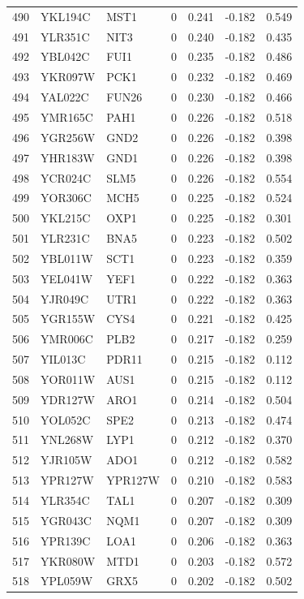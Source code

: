 \begin{longtable}{rllrrrr}
490 & YKL194C & MST1 & 0 & 0.241 & -0.182 & 0.549\\
491 & YLR351C & NIT3 & 0 & 0.240 & -0.182 & 0.435\\
492 & YBL042C & FUI1 & 0 & 0.235 & -0.182 & 0.486\\
493 & YKR097W & PCK1 & 0 & 0.232 & -0.182 & 0.469\\
494 & YAL022C & FUN26 & 0 & 0.230 & -0.182 & 0.466\\
495 & YMR165C & PAH1 & 0 & 0.226 & -0.182 & 0.518\\
496 & YGR256W & GND2 & 0 & 0.226 & -0.182 & 0.398\\
497 & YHR183W & GND1 & 0 & 0.226 & -0.182 & 0.398\\
498 & YCR024C & SLM5 & 0 & 0.226 & -0.182 & 0.554\\
499 & YOR306C & MCH5 & 0 & 0.225 & -0.182 & 0.524\\
500 & YKL215C & OXP1 & 0 & 0.225 & -0.182 & 0.301\\
501 & YLR231C & BNA5 & 0 & 0.223 & -0.182 & 0.502\\
502 & YBL011W & SCT1 & 0 & 0.223 & -0.182 & 0.359\\
503 & YEL041W & YEF1 & 0 & 0.222 & -0.182 & 0.363\\
504 & YJR049C & UTR1 & 0 & 0.222 & -0.182 & 0.363\\
505 & YGR155W & CYS4 & 0 & 0.221 & -0.182 & 0.425\\
506 & YMR006C & PLB2 & 0 & 0.217 & -0.182 & 0.259\\
507 & YIL013C & PDR11 & 0 & 0.215 & -0.182 & 0.112\\
508 & YOR011W & AUS1 & 0 & 0.215 & -0.182 & 0.112\\
509 & YDR127W & ARO1 & 0 & 0.214 & -0.182 & 0.504\\
510 & YOL052C & SPE2 & 0 & 0.213 & -0.182 & 0.474\\
511 & YNL268W & LYP1 & 0 & 0.212 & -0.182 & 0.370\\
512 & YJR105W & ADO1 & 0 & 0.212 & -0.182 & 0.582\\
513 & YPR127W & YPR127W & 0 & 0.210 & -0.182 & 0.583\\
514 & YLR354C & TAL1 & 0 & 0.207 & -0.182 & 0.309\\
515 & YGR043C & NQM1 & 0 & 0.207 & -0.182 & 0.309\\
516 & YPR139C & LOA1 & 0 & 0.206 & -0.182 & 0.363\\
517 & YKR080W & MTD1 & 0 & 0.203 & -0.182 & 0.572\\
518 & YPL059W & GRX5 & 0 & 0.202 & -0.182 & 0.502\\

\end{longtable}
